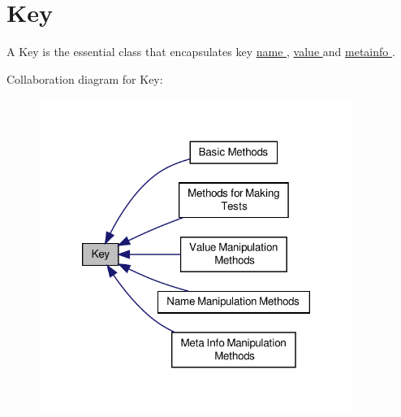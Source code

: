 \hypertarget{group__key}{\section{Key}
\label{group__key}
}


A Key is the essential class that encapsulates key \hyperlink{group__keyname}{name }, \hyperlink{group__keyvalue}{value } and \hyperlink{group__keymeta}{metainfo }.  


Collaboration diagram for Key\-:
\nopagebreak
\begin{figure}[H]
\begin{center}
\leavevmode
\includegraphics[width=290pt]{group__key}
\end{center}
\end{figure}
